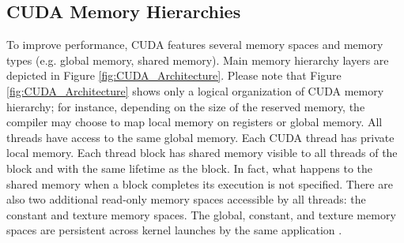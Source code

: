 \documentclass[11pt,onecolumn,letterpaper]{IEEEtran}
\begin{document}
\begin{center}
\begin{table*}
\caption{CUDA \textit{Compute Capability} (CC) version, introduced novelty, and potential sources of security issues}
\label{tab:cudacomputecapabilities}
\end{table*}
\end{center}
\normalsize

\subsection{CUDA Memory Hierarchies}



To improve performance, CUDA features several memory spaces and memory types (e.g. global memory, shared memory).
Main memory hierarchy layers are depicted in Figure \ref{fig:CUDA_Architecture}.
Please note that Figure \ref{fig:CUDA_Architecture} shows only a logical organization
of CUDA memory hierarchy; for instance, depending on the size of the reserved memory,
the compiler may choose to map local memory on registers or global memory.
All threads have access to the same global memory.
Each CUDA thread has private local memory.
Each thread block has shared memory visible to all threads of the block and with the same lifetime as the block.
In fact, what happens to the shared memory when a block completes its execution is not specified.
There are also two additional read-only memory spaces accessible by all threads: the constant and texture memory spaces.
The global, constant, and texture memory spaces are persistent across kernel launches by the same application \cite{cudadevguide}.
\end{document}
